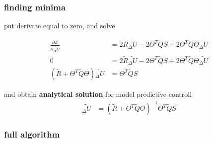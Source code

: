 \documentclass{beamer}
\begin{document}
\begin{frame}
  
  \frametitle{\bf finding minima}

  put derivate equal to zero, and solve

  \begin{align*}
    \frac{\partial \mathcal{L}}{\partial {\tilde{_\Delta U}}} & = 2 \tilde{R} \tilde{_\Delta U} - 2\Theta^T\tilde{Q}S + 2\Theta^T\tilde{Q}\Theta\tilde{_\Delta U} \\
    0 &= 2 \tilde{R} \tilde{_\Delta U} - 2\Theta^T\tilde{Q}S + 2\Theta^T\tilde{Q}\Theta\tilde{_\Delta U} \\
    (\tilde{R} + \Theta^T\tilde{Q}\Theta)\tilde{_\Delta U}  &= \Theta^T\tilde{Q}S 
  \end{align*}  

  and obtain {\bf \color{red} analytical solution} for model predictive controll
  \begin{align*}
    \tilde{_\Delta U} &= (\tilde{R} + \Theta^T\tilde{Q}\Theta)^{-1} \Theta^T\tilde{Q}S
  \end{align*} 

\end{frame}



\begin{frame}
  
  \frametitle{\bf full algorithm}

\end{frame}
\end{document}
